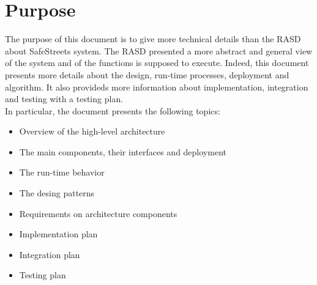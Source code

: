     \section{Purpose}
    The purpose of this document is to give more technical details than the RASD
    about SafeStreets system. The RASD presented a more abstract and general
    view of the system and of the functions is supposed to execute. Indeed, this
    document presents more details about the design, run-time processes,
    deployment and algorithm. It also provideds more information about
    implementation, integration and testing with a testing plan.\\
    In particular, the document presents the following topics:
    \begin{itemize}
        \item Overview of the high-level architecture
        \item The main components, their interfaces and deployment
        \item The run-time behavior
        \item The desing patterns
        \item Requirements on architecture components
        \item Implementation plan
        \item Integration plan
        \item Testing plan
    \end{itemize}    
    
